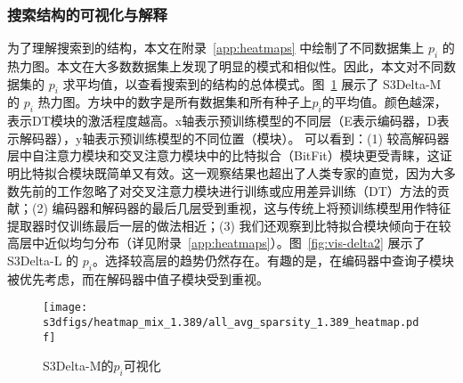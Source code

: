 \begin{table}[!htbp]
    \caption{搜索阶段和重新训练阶段的计算资源}
    \label{tab:computation}
    \centering
\end{table}

\subsubsection{搜索结构的可视化与解释}
\label{sec:vis}
为了理解搜索到的结构，本文在附录~\ref{app:heatmaps} 中绘制了不同数据集上 $p_i$ 的热力图。本文在大多数数据集上发现了明显的模式和相似性。因此，本文对不同数据集的 $p_i$ 求平均值，以查看搜索到的结构的总体模式。图~\ref{fig:visualization} 展示了 S3Delta-M 的 $p_i$ 热力图。方块中的数字是所有数据集和所有种子上$p_i$的平均值。颜色越深，表示DT模块的激活程度越高。x轴表示预训练模型的不同层（E表示编码器，D表示解码器），y轴表示预训练模型的不同位置（模块）。
可以看到：(1) 较高解码器层中自注意力模块和交叉注意力模块中的比特拟合（BitFit）模块更受青睐，这证明比特拟合模块既简单又有效。这一观察结果也超出了人类专家的直觉，因为大多数先前的工作忽略了对交叉注意力模块进行训练或应用差异训练（DT）方法的贡献；(2) 编码器和解码器的最后几层受到重视，这与传统上将预训练模型用作特征提取器时仅训练最后一层的做法相近；(3) 我们还观察到比特拟合模块倾向于在较高层中近似均匀分布（详见附录~\ref{app:heatmaps}）。图~\ref{fig:vis-delta2} 展示了 S3Delta-L 的 $p_i$。选择较高层的趋势仍然存在。有趣的是，在编码器中查询子模块被优先考虑，而在解码器中值子模块受到重视。 

\begin{figure}[!htbp]
    \centering
    \texttt{[image: s3dfigs/heatmap\_mix\_1.389/all\_avg\_sparsity\_1.389\_heatmap.pdf]}
    \caption{S3Delta-M的$p_i$可视化}
    \label{fig:visualization}
\end{figure}

